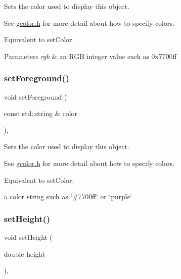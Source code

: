 Sets the color used to display this object. 

See \mbox{\hyperlink{gcolor_8h_source}{gcolor.\+h}} for more detail about how to specify colors.

Equivalent to set\+Color.


\begin{DoxyParams}{Parameters}
{\em rgb} & an R\+GB integer value such as 0x7700ff \\
\hline
\end{DoxyParams}
\mbox{\label{classGObject_af59209aeadea6dfc6d97a2d8531f50e1}} 
\subsubsection{\texorpdfstring{set\+Foreground()}{setForeground()}\hspace{0.1cm}{\footnotesize\ttfamily [3/3]}}
{\footnotesize\ttfamily void set\+Foreground (\begin{DoxyParamCaption}\item[{const std\+::string \&}]{color }\end{DoxyParamCaption})\hspace{0.3cm}{\ttfamily [virtual]}, {\ttfamily [inherited]}}



Sets the color used to display this object. 

See \mbox{\hyperlink{gcolor_8h_source}{gcolor.\+h}} for more detail about how to specify colors.

Equivalent to set\+Color.

a color string such as \char`\"{}\#7700ff\char`\"{} or \char`\"{}purple\char`\"{} \mbox{\label{classGObject_a9e280bfc4544dfaf8e4376c4e1a74357}} 
\subsubsection{\texorpdfstring{set\+Height()}{setHeight()}}
{\footnotesize\ttfamily void set\+Height (\begin{DoxyParamCaption}\item[{double}]{height }\end{DoxyParamCaption})\hspace{0.3cm}{\ttfamily [virtual]}, {\ttfamily [inherited]}}



